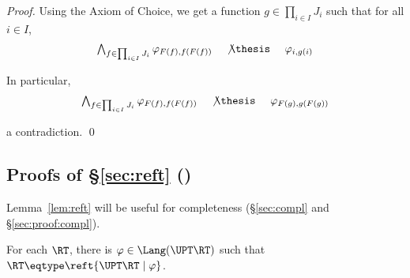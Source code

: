 \begin{proof}
\noindent
Using the Axiom of Choice, we get a function $g \in \prod_{i \in I}J_i$
such that for all $i \in I$,
\begin{equation*}
\begin{array}{l !{~}l!{~} l}
  \bigwedge_{f \in \prod_{i \in I}J_i}
  \varphi_{F(f),f(F(f))}
& \not\thesis
& \varphi_{i,g(i)}
\end{array}
\end{equation*}

\noindent
In particular,
\begin{equation*}
\begin{array}{l !{~}l!{~} l}
  \bigwedge_{f \in \prod_{i \in I}J_i}
  \varphi_{F(f),f(F(f))}
& \not\thesis
& \varphi_{F(g),g(F(g))}
\end{array}
\end{equation*}

\noindent
a contradiction.
\qed
\end{proof}


\subsection{Proofs of \S\ref{sec:reft} ()}
\label{sec:proof:reft}

Lemma~\ref{lem:reft}
will be useful for completeness (\S\ref{sec:compl} and \S\ref{sec:proof:compl}).

\begin{lemma}
\label{lem:proof:reft}
For each $\RT$, there is $\varphi \in \Lang(\UPT\RT)$
such that $\RT \eqtype \reft{\UPT\RT \mid \varphi}$.
\end{lemma}

